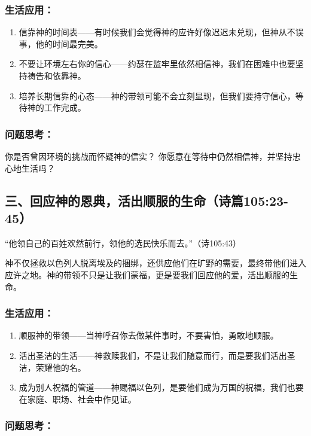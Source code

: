 \documentclass[a4paper, 12pt]{article}
\begin{document}
\subsubsection*{生活应用：}
\begin{enumerate}
    \item 信靠神的时间表——有时候我们会觉得神的应许好像迟迟未兑现，但神从不误事，他的时间最完美。

    \item 不要让环境左右你的信心——约瑟在监牢里依然相信神，我们在困难中也要坚持祷告和依靠神。

    \item 培养长期信靠的心态——神的带领可能不会立刻显现，但我们要持守信心，等待神的工作完成。

\end{enumerate}
\subsubsection*{问题思考：}

你是否曾因环境的挑战而怀疑神的信实？
你愿意在等待中仍然相信神，并坚持忠心地生活吗？
\subsection*{三、回应神的恩典，活出顺服的生命（诗篇105:23-45）}
“他领自己的百姓欢然前行，领他的选民快乐而去。”（诗105:43）

神不仅拯救以色列人脱离埃及的捆绑，还供应他们在旷野的需要，最终带他们进入应许之地。神的带领不只是让我们蒙福，更是要我们回应他的爱，活出顺服的生命。

\subsubsection*{生活应用：}
\begin{enumerate}
    \item 顺服神的带领——当神呼召你去做某件事时，不要害怕，勇敢地顺服。

    \item 活出圣洁的生活——神救赎我们，不是让我们随意而行，而是要我们活出圣洁，荣耀他的名。

    \item 成为别人祝福的管道——神赐福以色列，是要他们成为万国的祝福，我们也要在家庭、职场、社会中作见证。

\end{enumerate}
\subsubsection*{问题思考：}
\end{document}
